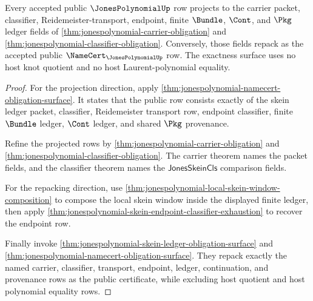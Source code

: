 \begin{theorem}
\label{thm:jonespolynomial-ledger-exactness-obligation}
Every accepted public $\JonesPolynomialUp$ row projects to the carrier packet,
classifier, Reidemeister-transport, endpoint, finite $\Bundle$, $\Cont$, and
$\Pkg$ ledger fields of
\autoref{thm:jonespolynomial-carrier-obligation} and
\autoref{thm:jonespolynomial-classifier-obligation}. Conversely, those fields
repack as the accepted public $\NameCert_{\JonesPolynomialUp}$ row. The exactness
surface uses no host knot quotient and no host Laurent-polynomial equality.
\end{theorem}
\begin{proof}
For the projection direction, apply
\autoref{thm:jonespolynomial-namecert-obligation-surface}. It states that the
public row consists exactly of the skein ledger packet, classifier,
Reidemeister transport row, endpoint classifier, finite $\Bundle$ ledger,
$\Cont$ ledger, and shared $\Pkg$ provenance.

Refine the projected rows by
\autoref{thm:jonespolynomial-carrier-obligation} and
\autoref{thm:jonespolynomial-classifier-obligation}. The carrier theorem names
the packet fields, and the classifier theorem names the
$\mathsf{JonesSkeinCls}$ comparison fields.

For the repacking direction, use
\autoref{thm:jonespolynomial-local-skein-window-composition} to compose the
local skein window inside the displayed finite ledger, then apply
\autoref{thm:jonespolynomial-skein-endpoint-classifier-exhaustion} to recover
the endpoint row.

Finally invoke
\autoref{thm:jonespolynomial-skein-ledger-obligation-surface} and
\autoref{thm:jonespolynomial-namecert-obligation-surface}. They repack exactly
the named carrier, classifier, transport, endpoint, ledger, continuation, and
provenance rows as the public certificate, while excluding host quotient and
host polynomial equality rows.
\end{proof}

